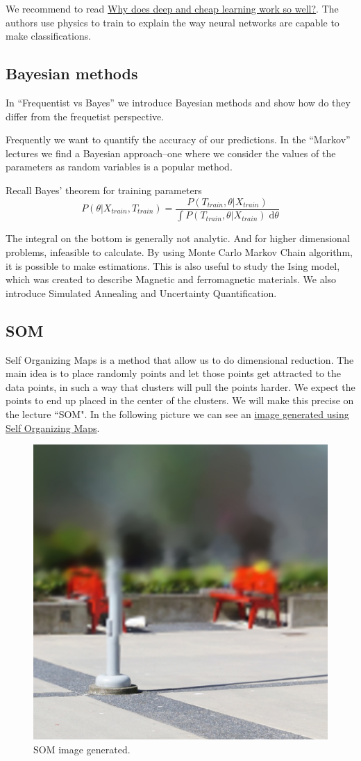 \documentclass[11pt,letterpaper]{report}
\begin{document}
	
	We recommend to read 	\href{    https://arxiv.org/abs/1608.08225 
	}{Why does deep and cheap learning work so well?}\cite{Lin2017}.  The authors use physics to train to explain the way neural networks are capable to make classifications. 
\subsection{Bayesian methods}
In ``Frequentist vs Bayes''
 we introduce Bayesian methods and show how do they differ from the frequetist perspective. 
 
Frequently we want to quantify the accuracy of our predictions. In the ``Markov'' lectures we find a Bayesian approach--one where we consider the values of the parameters as random variables is a popular method.

Recall Bayes' theorem for training parameters
\begin{equation}
P(\theta|X_{train}, T_{train}) = \frac{P(T_{train}, \theta|X_{train})}{\int P(T_{train}, \theta|X_{train})\;\mathrm{d}\theta} 
\end{equation}

The integral on the bottom is generally not analytic. And for higher dimensional problems, infeasible to calculate. By using Monte Carlo Markov Chain algorithm, it is possible to make estimations.  This is also useful to study   the Ising model, which was created to describe Magnetic and ferromagnetic materials. We also introduce Simulated Annealing and Uncertainty Quantification.
\subsection{SOM}
Self Organizing Maps is a method that allow us to do dimensional reduction. The main idea is to place randomly points and let those points get attracted to the data points, in such a way that clusters will pull the points harder. We expect the points to end up placed in the center of the clusters. We will make this precise on the lecture ``SOM". 
In the following picture we can see an \href{https://github.com/ANNetGPGPU/ANNetGPGPU}{ image
	generated using Self Organizing Maps}\cite{wsom}.

\begin{figure}[h!]
	\centering
	\includegraphics[width=0.45\linewidth]{figures/ex.jpg}
	\caption{SOM image generated.} 
	\label{fig:som}
\end{figure} 	
\end{document}
